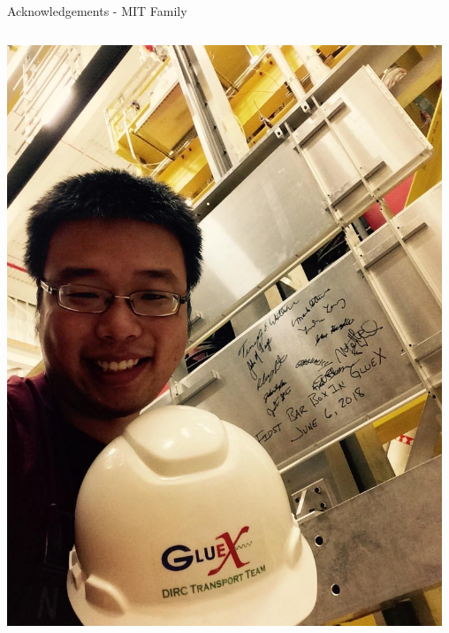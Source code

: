 \documentclass[aspectratio=169]{beamer}
\begin{document}
\begin{frame}{Acknowledgements - MIT Family }
\begin{columns}
            \includegraphics[width=0.9765\textwidth]{people/band/yunjie.png}        
    \end{columns}
    
\end{frame}
\end{document}
